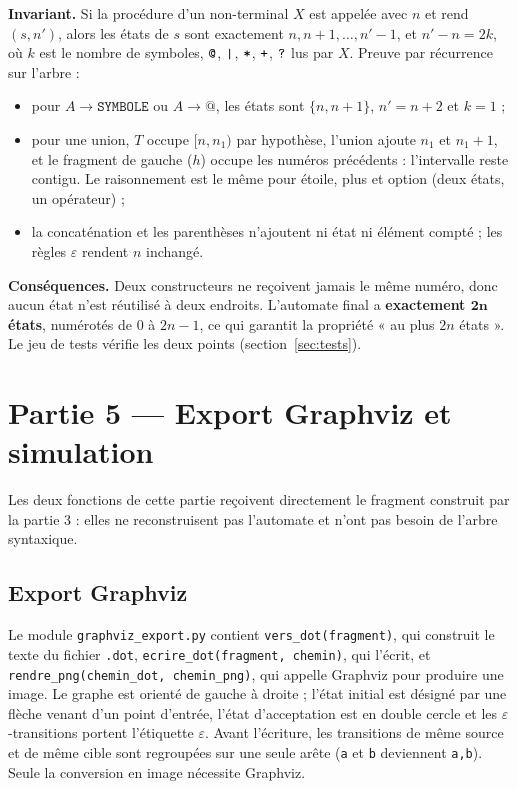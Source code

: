 \documentclass[12pt,a4paper]{article}
\newcommand{\code}[1]{{\fontsize{10}{12}\selectfont\texttt{#1}}}
\newcommand{\eps}{\ensuremath{\varepsilon}}
\newcommand{\tok}[1]{\ensuremath{\text{\fontsize{10}{12}\selectfont\ttfamily #1}}}
\begin{document}
\textbf{Invariant.} Si la procédure d'un non-terminal $X$ est appelée avec $n$ et rend
$(s, n')$, alors les états de $s$ sont exactement $n, n+1, \dots, n'-1$, et $n' - n = 2k$, où
$k$ est le nombre de symboles, \tok{@}, \tok{|}, \tok{*}, \tok{+}, \tok{?} lus par $X$. Preuve
par récurrence sur l'arbre :
\begin{itemize}
\item pour $A \to \texttt{SYMBOLE}$ ou $A \to \texttt{@}$, les états sont $\{n, n+1\}$,
  $n' = n+2$ et $k = 1$ ;
\item pour une union, $T$ occupe $[n, n_1)$ par hypothèse, l'union ajoute $n_1$ et $n_1+1$, et le
  fragment de gauche ($h$) occupe les numéros précédents : l'intervalle reste contigu. Le
  raisonnement est le même pour étoile, plus et option (deux états, un opérateur) ;
\item la concaténation et les parenthèses n'ajoutent ni état ni élément compté ; les règles
  \eps{} rendent $n$ inchangé.
\end{itemize}
\textbf{Conséquences.} Deux constructeurs ne reçoivent jamais le même numéro, donc aucun état
n'est réutilisé à deux endroits. L'automate final a \textbf{exactement $\boldsymbol{2n}$ états},
numérotés de 0 à $2n-1$, ce qui garantit la propriété « au plus $2n$ états ». Le jeu de tests
vérifie les deux points (section~\ref{sec:tests}).

\section{Partie 5 --- Export Graphviz et simulation}\label{sec:partie5}

Les deux fonctions de cette partie reçoivent directement le fragment construit par la partie 3 :
elles ne reconstruisent pas l'automate et n'ont pas besoin de l'arbre syntaxique.

\subsection{Export Graphviz}

Le module \code{graphviz\_export.py} contient \code{vers\_dot(fragment)}, qui construit le texte du
fichier \code{.dot}, \code{ecrire\_dot(fragment, chemin)}, qui l'écrit, et
\code{rendre\_png(chemin\_dot, chemin\_png)}, qui appelle Graphviz pour produire une image. Le graphe
est orienté de gauche à droite ; l'état initial est désigné par une flèche venant d'un point
d'entrée, l'état d'acceptation est en double cercle et les \eps-transitions portent l'étiquette
\eps. Avant l'écriture, les transitions de même source et de même cible sont regroupées sur une
seule arête (\code{a} et \code{b} deviennent \code{a,b}). Seule la conversion en image nécessite
Graphviz.
\end{document}
